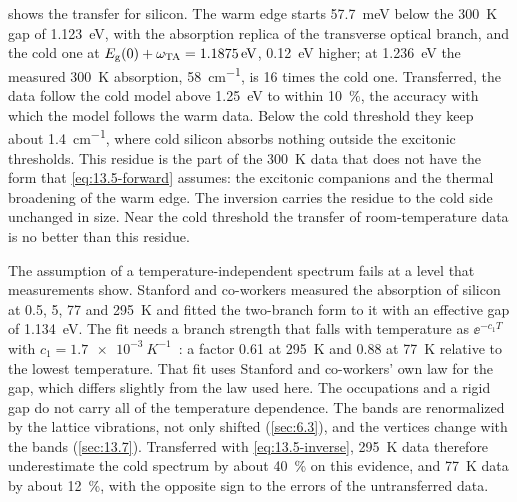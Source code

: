  shows the transfer for silicon. The warm edge starts \SI{57.7}{meV} below the \SI{300}{K} gap of \SI{1.123}{eV}, with the absorption replica of the transverse optical branch, and the cold one at $E_{\mathrm{g}}(0) + \omega_{\mathrm{TA}} = \SI{1.1875}{eV}$, \SI{0.12}{eV} higher; at \SI{1.236}{eV} the measured \SI{300}{K} absorption, \SI{58}{cm^{-1}}, is 16 times the cold one. Transferred, the data follow the cold model above \SI{1.25}{eV} to within \SI{10}{\percent}, the accuracy with which the model follows the warm data. Below the cold threshold they keep about \SI{1.4}{cm^{-1}}, where cold silicon absorbs nothing outside the excitonic thresholds. This residue is the part of the \SI{300}{K} data that does not have the form that \cref{eq:13.5-forward} assumes: the excitonic companions and the thermal broadening of the warm edge. The inversion carries the residue to the cold side unchanged in size. Near the cold threshold the transfer of room-temperature data is no better than this residue.

The assumption of a temperature-independent spectrum fails at a level that measurements show. Stanford and co-workers measured the absorption of silicon at 0.5, 5, 77 and \SI{295}{K} and fitted the two-branch form to it with an effective gap of \SI{1.134}{eV}. The fit needs a branch strength that falls with temperature as $\ee^{-c_1T}$ with $c_1 = \SI{1.7e-3}{K^{-1}}$~\cite[Eqs.~(6) and (7)]{stanford2021photoelectric}: a factor 0.61 at \SI{295}{K} and 0.88 at \SI{77}{K} relative to the lowest temperature. That fit uses Stanford and co-workers' own law for the gap, which differs slightly from the law used here. The occupations and a rigid gap do not carry all of the temperature dependence. The bands are renormalized by the lattice vibrations, not only shifted (\cref{sec:6.3}), and the vertices change with the bands (\cref{sec:13.7}). Transferred with \cref{eq:13.5-inverse}, \SI{295}{K} data therefore underestimate the cold spectrum by about \SI{40}{\percent} on this evidence, and \SI{77}{K} data by about \SI{12}{\percent}, with the opposite sign to the errors of the untransferred data.

